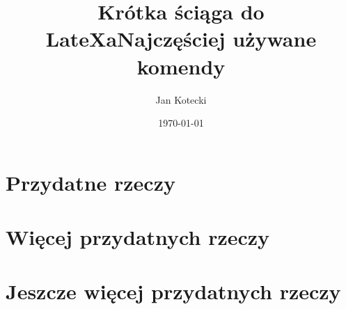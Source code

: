 \documentclass{article}
\begin{document}
\title{Krótka ściąga do LateXa}

\author{Jan Kotecki}
\date{\today}

\maketitle
\section{Przydatne rzeczy}
\section{Więcej przydatnych rzeczy}
\section{Jeszcze więcej przydatnych rzeczy}

\begin{center}
\newpage

\title{\Large Najczęściej używane komendy}
\maketitle
\end{center}
\end{document}
